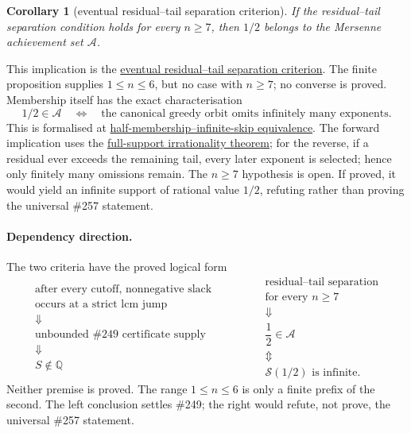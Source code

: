 \documentclass[11pt]{article}
\newcommand{\commit}{99f4bf47422abbd8757cbb22b50ba079d764d3a7}
\newcommand{\repobase}{https://github.com/wcook04/plectis-erdos/blob/\commit}
\newcommand{\PK}{Erdos249257}
\newcommand{\lword}[4]{\href{\repobase/\PK/#1\#L#2}{#4}}
\newtheorem{corollary}[theorem]{Corollary}
\theoremstyle{definition}
\theoremstyle{remark}
\newcommand{\Q}{\mathbb{Q}}
\begin{document}
\begin{corollary}[eventual residual--tail separation criterion]
\label{res:secondcriterion}
If the residual--tail separation condition holds for every \(n\ge7\), then
\(1/2\) belongs to the Mersenne achievement set \(\mathcal A\).
\end{corollary}
\noindent This implication is the
\lword{GreedyAchievementSet.lean}{3151}{half_mem_mersenneAchievementSet_of_secondChannelSeparationRat_from_seven}{eventual residual--tail separation criterion}.
The finite proposition supplies \(1\le n\le6\), but no case with \(n\ge7\);
no converse is proved.  Membership itself has the exact characterisation
\[
  1/2\in\mathcal A
  \quad\Longleftrightarrow\quad
  \text{the canonical greedy orbit omits infinitely many exponents}.
\]
This is formalised at
\lword{GreedyAchievementSet.lean}{2583}{half_mem_mersenneAchievementSet_iff_greedySkippedSupport_infinite}{half-membership--infinite-skip equivalence}.
The forward implication uses the
\hyperref[res:full]{full-support irrationality theorem}; for the reverse,
if a residual ever exceeds the remaining tail, every later exponent is
selected; hence only finitely many omissions remain.  The \(n\ge7\) hypothesis
is open.  If proved, it would yield an infinite support of rational value
\(1/2\), refuting rather than proving the universal \#257 statement.

\paragraph{Dependency direction.}
The two criteria have the proved logical form
\[
\begin{array}{c}
 \text{after every cutoff, nonnegative slack}\\[-1pt]
 \text{occurs at a strict lcm jump}\\
 \Downarrow\\
 \text{unbounded \#249 certificate supply}\\
 \Downarrow\\
 S\notin\Q
\end{array}
\qquad\qquad
\begin{array}{c}
 \text{residual--tail separation}\\[-1pt]
 \text{for every }n\ge7\\
 \Downarrow\\
 \dfrac12\in\mathcal A\\
 \Updownarrow\\
 \mathcal S(1/2)\text{ is infinite}.
\end{array}
\]
Neither premise is proved.  The range \(1\le n\le6\) is only a finite prefix
of the second.  The left conclusion settles \#249; the right would refute,
not prove, the universal \#257 statement.
\end{document}
